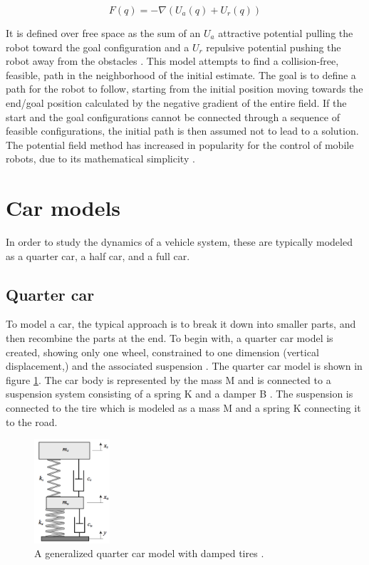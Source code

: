 \begin{equation} \label{eq:potential_fields}
F(q)=-\nabla(U_a(q)+U_r(q))
\end{equation}

It is defined over free space as the sum of an $U_a$ attractive potential pulling the robot toward the goal configuration and a $U_r$ repulsive potential pushing the robot away from the obstacles \cite{article:potential_fields_convoy}. This model attempts to find a collision-free, feasible, path in the neighborhood of the initial estimate. The goal is to define a path for the robot to follow, starting from the initial position moving towards the end/goal position calculated by the negative gradient of the entire field. If the start and the goal configurations cannot be connected through a sequence of feasible configurations, the initial path is then assumed not to lead to a solution. The potential field method has increased in popularity for the control of mobile robots, due to its mathematical simplicity \cite{article:potential_fields_convoy}.

\section{Car models}
In order to study the dynamics of a vehicle system, these are typically modeled as a quarter car, a half car, and a full car.

\subsection{Quarter car}
To model a car, the typical approach is to break it down into smaller parts, and then recombine the parts at the end. To begin with, a quarter car model is created, showing only one wheel, constrained to one dimension (vertical displacement,) and the associated suspension \cite{article:convoy_comm,article:motion_planning_apf}. The quarter car model is shown in figure \ref{fig:quarter_car}. The car body is represented by the mass M and is connected to a suspension system consisting of a spring K and a damper B . The suspension is connected to the tire which is modeled as a mass M and a spring K connecting it to the road.

\begin{figure}[t]
	\centering
	\includegraphics[width=0.25\textwidth]{figures/quarter_car.png}
	\caption{A generalized quarter car model with damped tires \cite{book:jazar}.}
	\label{fig:quarter_car}
\end{figure}

